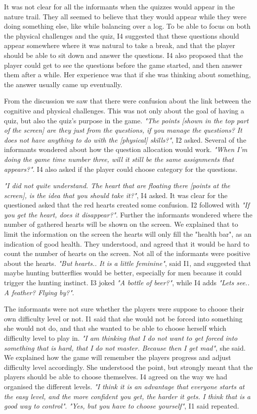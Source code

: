 It was not clear for all the informants when the quizzes would appear in the nature trail. They all seemed to believe that they would appear while they were doing something else, like while balancing over a log. To be able to focus on both the physical challenges and the quiz, I4 suggested that these questions should appear somewhere where it was natural to take a break, and that the player should be able to sit down and answer the questions. I4 also proposed that the player could get to see the questions before the game started, and then answer them after a while. Her experience was that if she was thinking about something, the answer usually came up eventually.  

From the discussion we saw that there were confusion about the link between the cognitive and physical challenges. This was not only about the goal of having a quiz, but also the quiz's purpose in the game. \emph{"The points [shown in the top part of the screen] are they just from the questions, if you manage the questions? It does not have anything to do with the [physical] skills?"}, I2 asked. Several of the informants wondered about how the question allocation would work. \emph{"When I'm doing the game time number three, will it still be the same assignments that appears?"}. I4 also asked if the player could choose category for the questions. 

\emph{"I did not quite understand. The heart that are floating there [points at the screen], is the idea that you should take it?"}, I4 asked. It was clear for the questioned asked that the red hearts created some confusion. I2 followed with \emph{"If you get the heart, does it disappear?"}. Further the informants wondered where the number of gathered hearts will be shown on the screen. We explained that to limit the information on the screen the hearts will only fill the "health bar", as an indication of good health. They understood, and agreed that it would be hard to count the number of hearts on the screen. Not all of the informants were positive about the hearts. \emph{"But hearts.. It is a little feminine"}, said I1, and suggested that maybe hunting butterflies would be better, especially for men because it could trigger the hunting instinct. I3 joked \emph{"A bottle of beer?"}, while I4 adds \emph{"Lets see.. A feather? Flying by?"}. 

The informants were not sure whether the players were suppose to choose their own difficulty level or not. I1 said that she would not be forced into something she would not do, and that she wanted to be able to choose herself which difficulty level to play in. \emph{"I am thinking that I do not want to get forced into something that is hard, that I do not master. Because then I get mad"}, she said. We explained how the game will remember the players progress and adjust difficulty level accordingly. She understood the point, but strongly meant that the players should be able to choose themselves. I4 agreed on the way we had organised the different levels. \emph{"I think it is an advantage that everyone starts at the easy level, and the more confident you get, the harder it gets. I think that is a good way to control"}. \emph{"Yes, but you have to choose yourself"}, I1 said repeated. 

